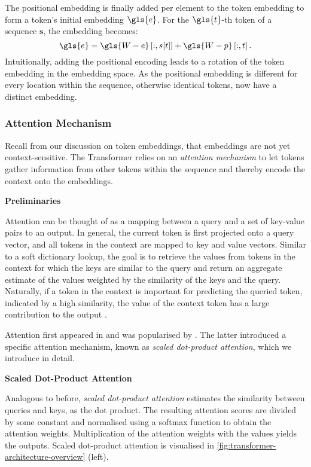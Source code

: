 The positional embedding is finally added per element to the token embedding to form a \gls{token}'s initial embedding $\gls{e}$. For the $\gls{t}$-th \gls{token} of a sequence $\mathbf{s}$, the embedding becomes:
\begin{equation}
    \gls{e}=\gls{W-e}\left[:, s[t]\right]+\gls{W-p}\left[:, t\right].
    \label{eq:positional-embedding}
\end{equation}
Intuitionally, adding the positional encoding leads to a rotation of the \gls{token} embedding in the embedding space. As the positional embedding is different for every location within the sequence, otherwise identical \glspl{token}, now have a distinct embedding.

\subsubsection{Attention Mechanism}\label{sec:attention}

Recall from our discussion on token embeddings, that embeddings are not yet context-sensitive. The Transformer relies on an \emph{attention mechanism} to let tokens gather information from other tokens within the sequence and thereby encode the context onto the embeddings.

\textbf{Preliminaries}

Attention can be thought of as a mapping between a query and a set of key-value pairs to an output. In general, the current token is first projected onto a query vector, and all tokens in the context are mapped to key and value vectors. Similar to a soft dictionary lookup, the goal is to retrieve the values from tokens in the context for which the keys are similar to the query and return an aggregate estimate of the values weighted by the similarity of the keys and the query. Naturally, if a token in the context is important for predicting the queried token, indicated by a high similarity, the value of the context token has a large contribution to the output \autocites[][5]{phuongFormalAlgorithmsTransformers2022}[][3]{vaswaniAttentionAllYou2017}.

Attention first appeared in \textcite[][4]{bahdanauNeuralMachineTranslation2016} and was popularised by \textcite[][4]{vaswaniAttentionAllYou2017}. The latter introduced a specific attention mechanism, known as \emph{scaled dot-product attention}, which we introduce in detail.

\textbf{Scaled Dot-Product Attention}

Analogous to before, \emph{scaled dot-product attention} estimates the similarity between queries and keys, as the dot product. The resulting attention scores are divided by some constant and normalised using a softmax function to obtain the attention weights. Multiplication of the attention weights with the values yields the outputs. Scaled dot-product attention is visualised in \cref{fig:transformer-architecture-overview} (left).

